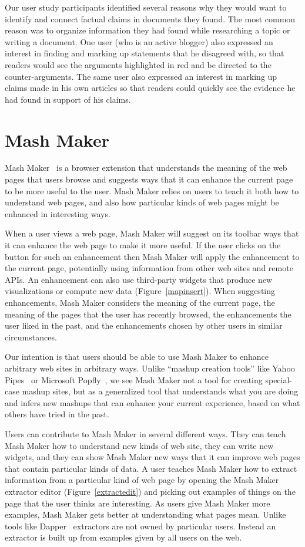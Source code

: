 \documentclass{chi2009}
\begin{document}
Our user study participants identified several reasons why they would want to identify and connect factual claims in documents they found. The most common reason was to organize information they had found while researching a topic or writing a document. One user (who is an active blogger) also expressed an interest in finding and marking up statements that he disagreed with, so that readers would see the arguments highlighted in red and be directed to the counter-arguments. The same user also expressed an interest in marking up claims made in his own articles so that readers could quickly see the evidence he had found in support of his claims. 


\section{Mash Maker}

Mash Maker~\cite{mashmaker} is a browser extension that understands the meaning of the web pages that users browse and suggests ways that it can enhance the current page to be more useful to the user. Mash Maker relies on users to teach it both how to understand web pages, and also how particular kinds of web pages might be enhanced in interesting ways.

When a user views a web page, Mash Maker will suggest on its toolbar ways that it can enhance the web page to make it more useful. If the user clicks on the button for such an enhancement then Mash Maker will apply the enhancement to the current page, potentially using information from other web sites and remote APIs. An enhancement can also use third-party widgets that produce new visualizations or compute new data (Figure~\ref{mapinsert}). When suggesting enhancements, Mash Maker considers the meaning of the current page, the meaning of the pages that the user has recently browsed, the enhancements the user liked in the past, and the enhancements chosen by other users in similar circumstances.

Our intention is that users should be able to use Mash Maker to enhance arbitrary web sites in arbitrary ways. Unlike ``mashup creation tools'' like Yahoo Pipes~\cite{pipes} or Microsoft Popfly~\cite{popfly}, we see Mash Maker not a tool for creating special-case mashup sites, but as a generalized tool that understands what you are doing and infers new mashups that can enhance your current experience, based on what others have tried in the past. 

Users can contribute to Mash Maker in several different ways. They can teach Mash Maker how to understand new kinds of web site, they can write new widgets, and they can show Mash Maker new ways that it can improve web pages that contain particular kinds of data. A user teaches Mash Maker how to extract information from a particular kind of web page by opening the Mash Maker extractor editor (Figure~\ref{extractedit}) and picking out examples of things on the page that the user thinks are interesting. As users give Mash Maker more examples, Mash Maker gets better at understanding what pages mean. Unlike tools like Dapper~\cite{dapper} extractors are not owned by particular users. Instead an extractor is built up from examples given by all users on the web. 
\end{document}
